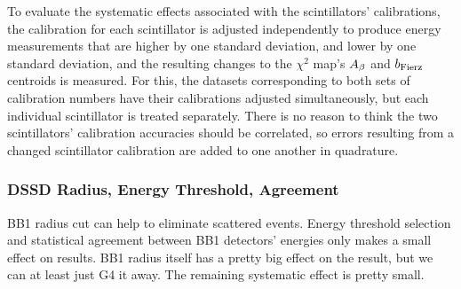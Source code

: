 To evaluate the systematic effects associated with the scintillators' calibrations, the calibration for each scintillator is adjusted independently to produce energy measurements that are higher by one standard deviation, and lower by one standard deviation, and the resulting changes to the $\chi^2$ map's $A_{\beta}$ and $b_{\mathrm{Fierz}}$ centroids is measured.  For this, the datasets corresponding to both sets of calibration numbers have their calibrations adjusted simultaneously, but each individual scintillator is treated separately.  There is no reason to think the two scintillators' calibration accuracies should be correlated, so errors resulting from a changed scintillator calibration are added to one another in quadrature.


\subsubsection{DSSD Radius, Energy Threshold, Agreement}
\label{section:bb1_systematics}
BB1 radius cut can help to eliminate scattered events.  Energy threshold selection and statistical agreement between BB1 detectors' energies only makes a small effect on results.  BB1 radius itself has a pretty big effect on the result, but we can at least just G4 it away.  The remaining systematic effect is pretty small.  
	
